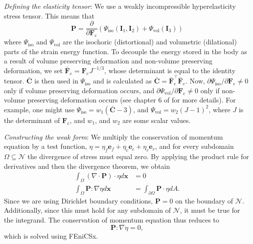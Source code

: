 \emph{Defining the elasticity tensor}: We use a weakly incompressible hyperelasticity stress tensor. This means that
\begin{equation*}
    \mathbf{P} = \frac{\partial }{\partial \mathbf{F}_e}(\Psi_\text{iso}(\mathbf{I}_1, \mathbf{I}_2) + \Psi_\text{vol}(\mathbf{I}_3))
\end{equation*}
where $\Psi_\text{iso}$ and $\Psi_\text{vol}$ are the isochoric (distortional) and volumetric (dilational) parts of the strain energy function. To decouple the energy stored in the body as a result of volume preserving deformation and non-volume preserving deformation, we set $\mathbf{\bar{F}}_e = \mathbf{F}_eJ^{-1/3}$, whose determinant is equal to the identity tensor. $\mathbf{\bar{C}}$ is then used in $\Psi_\text{iso}$ and is calculated as $\mathbf{\bar{C}} = \mathbf{\bar{F}}_e^\top \mathbf{\bar{F}}_e$. Now, $\partial\Psi_\text{iso}/\partial \mathbf{F}_e \neq 0$ only if volume preserving deformation occurs, and $\partial\Psi_\text{vol}/\partial \mathbf{F}_e \neq 0$ only if non-volume preserving deformation occurs (see chapter 6 of \citep{Holzapfel2002} for more details). For example, one might use $\Psi_\text{iso} = w_1\left(\mathbf{\bar{C}} - 3\right)$, and $\Psi_\text{vol} = w_2(J-1)^2$, where $J$ is the determinant of $\mathbf{F}_e$, and $w_1$, and $w_2$ are some scalar values. \par
\emph{Constructing the weak form}: We multiply the conservation of momentum equation by a test function, $\eta =  \eta_f\mathbf{e}_f + \eta_c\mathbf{e}_c + \eta_r\mathbf{e}_r$, and for every subdomain $\Omega \subseteq \mathcal{N}$ the divergence of stress must equal zero. By applying the product rule for derivatives and then the divergence theorem, we obtain
\begin{align*}
    \int_\Omega(\nabla\cdot\mathbf{P})\cdot\eta d\mathbf{x} &= 0 \\
    \int_\Omega \mathbf{P} : \nabla\eta d\mathbf{x} &= \int_{\partial\Omega}\mathbf{P}\cdot\eta dA.
\end{align*} 
Since we are using Dirichlet boundary conditions, $\mathbf{P} = 0$ on the boundary of $\mathcal{N}$. Additionally, since this must hold for any subdomain of $\mathcal{N}$, it must be true for the integrand. The conservation of momentum equation thus reduces to
\begin{equation}
\label{conservation of momentum}
    \mathbf{P} : \nabla\eta = 0,
\end{equation}
which is solved using FEniCSx.
\par
